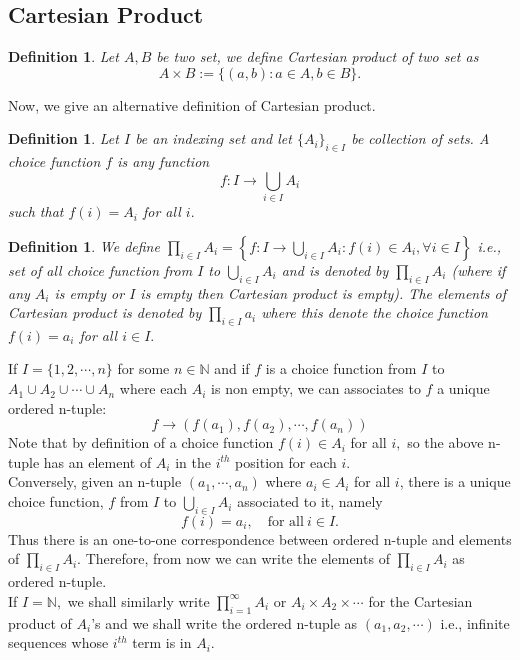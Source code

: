 \documentclass[11pt]{amsart}
\newtheorem{definition}[theorem]{Definition}%
\newtheorem{defn}[theorem]{Definition}
\newcommand{\NN}{\mathbb N}
\begin{document}
\subsection{Cartesian Product}
\begin{defn}
Let $A,B$ be two set, we define Cartesian product of two set as $$A\times B:=\{(a,b):a\in A,b\in B\}.$$
\end{defn}
Now, we give an alternative definition of Cartesian product.
\begin{defn}
Let $I$ be an indexing set and let $\{A_i\}_{i\in I}$ be collection of sets. A choice function $f$ is any function $$f:I\to \displaystyle\bigcup_{i\in I} A_i$$ such that $f(i)=A_i$ for all $i.$
\end{defn}
\begin{definition}
We define $\displaystyle\prod_{i\in I}A_i=\left\lbrace f:I\to \displaystyle\bigcup_{i\in I}A_i:f(i)\in A_i,\forall i\in I\right\rbrace  $ i.e., set of all choice function from $I$ to $\displaystyle\bigcup_{i\in I}A_i$ and is denoted by $\displaystyle\prod_{i\in I} A_i$ (where if any $A_i$ is empty or $I$ is empty then Cartesian product is empty). The elements of Cartesian product is denoted by $\displaystyle\prod_{i\in I} a_i$ where this denote the choice function $f(i)=a_i$ for all $i\in I.$
\end{definition}
If $I=\{1,2,\cdots ,n\}$ for some $n\in {\NN}$ and if $f$ is a choice function from $I$ to $A_1\cup A_2\cup \cdots \cup A_n$ where each $A_i$ is non empty, we can associates to $f$ a unique ordered n-tuple: $$f\to (f(a_1),f(a_2),\cdots ,f(a_n))$$
Note that by definition of a choice function $f(i)\in A_i$ for all $i,$ so the above n-tuple has an element of $A_i$ in the $i^{th}$ position for each $i.$\\
Conversely, given an n-tuple $(a_1,\cdots ,a_n)$ where $a_i\in A_i$ for all $i$, there is a unique choice function, $f$ from $I$ to  $\displaystyle\bigcup_{i\in I}A_i$ associated to it, namely $$f(i)=a_i,\quad \text{for all}~i\in I.$$
Thus there is an one-to-one correspondence between ordered  n-tuple and elements of $\displaystyle\prod_{i\in I} A_i.$ Therefore, from now we can write the elements of $\displaystyle\prod_{i\in I} A_i$ as ordered n-tuple. \\
If $I={\NN},$ we shall similarly write $\displaystyle\prod_{i=1}^{\infty} A_i$ or $A_i\times A_2\times \cdots$ for the Cartesian product of $A_i$'s and we shall write the ordered n-tuple as $(a_1,a_2,\cdots)$ i.e., infinite sequences whose $i^{th}$ term is in $A_i.$\\
\end{document}
